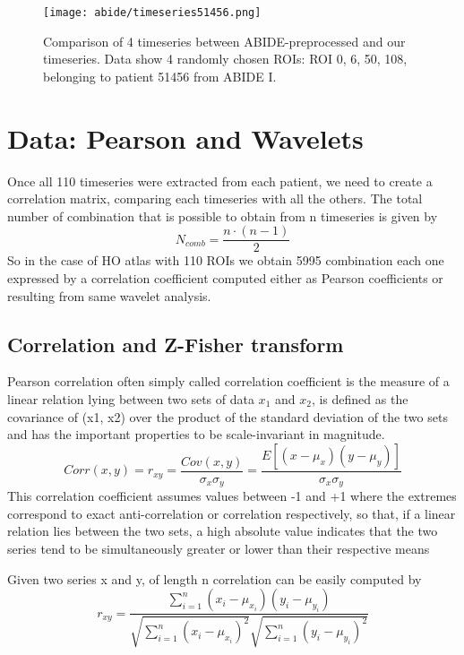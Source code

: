 \documentclass[a4paper,11pt]{article}
\begin{document}
\begin{figure}[h]
\centering
\texttt{[image: abide/timeseries51456.png]}
\caption{Comparison of 4 timeseries between ABIDE-preprocessed and our timeseries. Data show 4 randomly chosen ROIs: ROI 0, 6, 50, 108, belonging to patient 51456 from ABIDE I.}
\label{fig:confrontoabidepreproc}
\end{figure}




\section{Data: Pearson and Wavelets}
Once all 110 timeseries were extracted from each patient, we need to create a correlation matrix, comparing each timeseries with all the others.
The total number of combination that is possible to obtain from n timeseries is given by
\begin{equation}
N_{comb} = \frac{n\cdot(n-1)}{2}
\end{equation}
So in the case of HO atlas with 110 ROIs we obtain 5995 combination each one expressed by a correlation coefficient computed either as Pearson coefficients or resulting from same wavelet analysis.
\subsection{Correlation and Z-Fisher transform}

Pearson correlation often simply called correlation coefficient is the measure of a linear relation lying between two sets of data $x_1$ and $x_2$, is defined as the covariance of (x1, x2) over the product of the standard deviation of the two sets and has the important properties to be scale-invariant in magnitude.
\begin{equation}
Corr(x, y) = r_{xy}=  \frac{Cov\left( x, y\right)}{\sigma_x \sigma_y} = \frac{E\left[ \left( x - \mu_x \right) \left( y - \mu_y \right)\right]}{\sigma_{x} \sigma_{y}}
\end{equation}
This correlation coefficient assumes values between -1 and +1 where the extremes correspond to exact anti-correlation or correlation respectively, so that, if a linear relation lies between the two sets, a high absolute value indicates that the two series tend to be simultaneously greater or lower than their respective means

Given two series x and y, of length n correlation can be easily computed by
\begin{equation}
r_{xy} = \frac{\sum_{i = 1}^n \left( x_i - \mu_{x_i}\right)\left( y_i - \mu_{y_i}\right)}{\sqrt{\sum_{i = 1}^n \left( x_i -\mu_{x_i}\right)^2}\sqrt{\sum_{i = 1}^n \left( y_i -\mu_{y_i}\right)^2}}
\end{equation}
\end{document}
